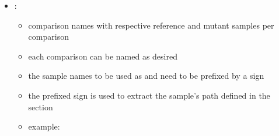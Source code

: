 \documentclass[letterpaper,10pt,english]{sphinxhowto}
\begin{document}
\begin{sphinxVerbatim}[commandchars=\\\{\}]
      
       
       
       
\end{sphinxVerbatim}
\begin{itemize}
\item {} 
\sphinxAtStartPar
{}:
\begin{itemize}
\item {} 
\sphinxAtStartPar
comparison names with respective reference and mutant samples per comparison

\item {} 
\sphinxAtStartPar
each comparison can be named as desired

\item {} 
\sphinxAtStartPar
the sample names to be used as  and  need to be prefixed by a \sphinxtitleref{*} sign

\item {} 
\sphinxAtStartPar
the \sphinxtitleref{*} prefixed sign is used to extract the sample’s path defined in the  section

\item {} 
\sphinxAtStartPar
example:

\end{itemize}

\end{itemize}
\end{document}
